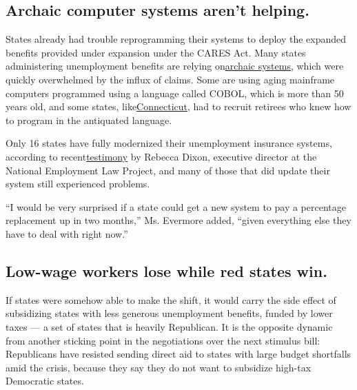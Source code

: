 \hypertarget{archaic-computer-systems-arent-helping}{%
\subsection{Archaic computer systems aren't
helping.}\label{archaic-computer-systems-arent-helping}}

States already had trouble reprogramming their systems to deploy the
expanded benefits provided under expansion under the CARES Act. Many
states administering unemployment benefits are relying
on\href{https://www.nytimes.com/2020/04/17/nyregion/coronavirus-pandemic-unemployment-assistance-ny-delays.html}{archaic
systems}, which were quickly overwhelmed by the influx of claims. Some
are using aging mainframe computers programmed using a language called
COBOL, which is more than 50 years old, and some states,
like\href{https://www.nytimes.com/2020/04/04/nyregion/coronavirus-ny-unemployment-benefits.html}{Connecticut},
had to recruit retirees who knew how to program in the antiquated
language.

Only 16 states have fully modernized their unemployment insurance
systems, according to
recent\href{https://www.nelp.org/publication/from-disrepair-to-transformation-how-to-revive-unemployment-insurance-information-technology-infrastructure/}{testimony}
by Rebecca Dixon, executive director at the National Employment Law
Project, and many of those that did update their system still
experienced problems.

``I would be very surprised if a state could get a new system to pay a
percentage replacement up in two months,'' Ms. Evermore added, ``given
everything else they have to deal with right now.''

\hypertarget{low-wage-workers-lose-while-red-states-win}{%
\subsection{Low-wage workers lose while red states
win.}\label{low-wage-workers-lose-while-red-states-win}}

If states were somehow able to make the shift, it would carry the side
effect of subsidizing states with less generous unemployment benefits,
funded by lower taxes --- a set of states that is heavily Republican. It
is the opposite dynamic from another sticking point in the negotiations
over the next stimulus bill: Republicans have resisted sending direct
aid to states with large budget shortfalls amid the crisis, because they
say they do not want to subsidize high-tax Democratic states.

